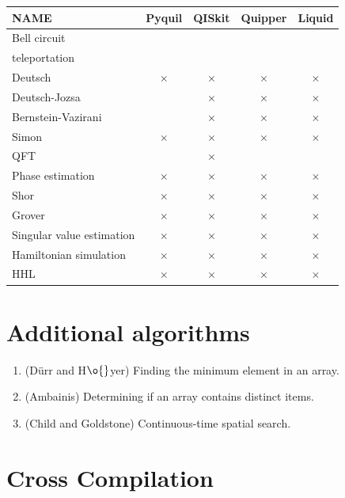 \documentclass[a4paper,10pt]{article}
\newcommand{\yup}{\checkmark}
\newcommand{\nup}{$\times$}
\begin{document}
\bigskip

\begin{tabular}{|l||c|c|c|c||} \hline
NAME				& Pyquil& QISkit& Quipper& Liquid \\ \hline \hline
Bell circuit 		& \yup	& \yup	& \yup	& \yup \\ \hline
teleportation 		& \yup	& \yup	& \yup	& \yup \\ \hline
Deutsch	 			& \nup	& \nup	& \nup	& \nup \\ \hline
Deutsch-Jozsa		& \yup	& \nup	& \nup	& \nup \\ \hline
Bernstein-Vazirani	& \yup	& \nup	& \nup	& \nup \\ \hline
Simon				& \nup	& \nup	& \nup	& \nup \\ \hline
QFT					& \yup	& \nup	& \yup	& \yup \\ \hline
Phase estimation	& \nup	& \nup	& \nup	& \nup \\ \hline
Shor				& \nup	& \nup	& \nup	& \nup \\ \hline
Grover				& \nup	& \nup	& \nup	& \nup \\ \hline
Singular value estimation	& \nup	& \nup	& \nup	& \nup \\ \hline
Hamiltonian simulation	& \nup	& \nup	& \nup	& \nup \\ \hline
HHL					& \nup	& \nup	& \nup	& \nup \\ \hline
\end{tabular}

\bigskip

\section{Additional algorithms}

\begin{enumerate}
\item (D\"{u}rr and H$\o{}$yer) Finding the minimum element in an array.

\item (Ambainis) Determining if an array contains distinct items.

\item (Child and Goldstone) Continuous-time spatial search.

\end{enumerate}

\section{Cross Compilation}
\end{document}
